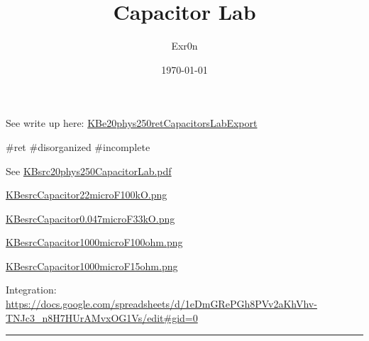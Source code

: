 \documentclass[letterpaper]{article}
\author{Exr0n}
\date{\today}
\title{Capacitor Lab}
\renewcommand{\tableofcontents}{}
\begin{document}
\tableofcontents

See write up here:
\href{KBe20phys250retCapacitorsLabExport.org}{KBe20phys250retCapacitorsLabExport}

\#ret \#disorganized \#incomplete

See
\href{KBsrc20phys250CapacitorLab.pdf.org}{KBsrc20phys250CapacitorLab.pdf}

\href{KBesrcCapacitor22microF100kO.png.org}{KBesrcCapacitor22microF100kO.png}

\href{KBesrcCapacitor0.047microF33kO.png.org}{KBesrcCapacitor0.047microF33kO.png}

\href{KBesrcCapacitor1000microF100ohm.png.org}{KBesrcCapacitor1000microF100ohm.png}

\href{KBesrcCapacitor1000microF15ohm.png.org}{KBesrcCapacitor1000microF15ohm.png}

Integration:
\url{https://docs.google.com/spreadsheets/d/1eDmGRePGh8PVv2aKhVhv-TNJc3\_n8H7HUrAMvxOG1Vs/edit\#gid=0}

\noindent\rule{\textwidth}{0.5pt}
\end{document}

